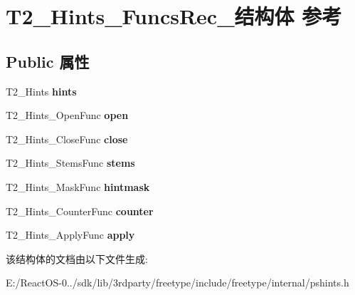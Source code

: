 \hypertarget{struct_t2___hints___funcs_rec__}{}\section{T2\+\_\+\+Hints\+\_\+\+Funcs\+Rec\+\_\+结构体 参考}
\label{struct_t2___hints___funcs_rec__}
\subsection*{Public 属性}
\begin{DoxyCompactItemize}
\item 
\mbox{\label{struct_t2___hints___funcs_rec___af8daab694889bede5a513fbae5f86e25}} 
T2\+\_\+\+Hints {\bfseries hints}
\item 
\mbox{\label{struct_t2___hints___funcs_rec___a1a5e0b296ee2e2ae6711b3ee35e5fcd9}} 
T2\+\_\+\+Hints\+\_\+\+Open\+Func {\bfseries open}
\item 
\mbox{\label{struct_t2___hints___funcs_rec___a7e50e26fd55254044bc9f2ba62574352}} 
T2\+\_\+\+Hints\+\_\+\+Close\+Func {\bfseries close}
\item 
\mbox{\label{struct_t2___hints___funcs_rec___a12bfd8bae5d3df8f570fcdfb70c00139}} 
T2\+\_\+\+Hints\+\_\+\+Stems\+Func {\bfseries stems}
\item 
\mbox{\label{struct_t2___hints___funcs_rec___af50d0cadda7033d7dbd27a199ccfcdd4}} 
T2\+\_\+\+Hints\+\_\+\+Mask\+Func {\bfseries hintmask}
\item 
\mbox{\label{struct_t2___hints___funcs_rec___ad9d856a64b4a8556fc8d74bae1779e11}} 
T2\+\_\+\+Hints\+\_\+\+Counter\+Func {\bfseries counter}
\item 
\mbox{\label{struct_t2___hints___funcs_rec___abaf12efb416bd79cf4ce72b13e6fc68f}} 
T2\+\_\+\+Hints\+\_\+\+Apply\+Func {\bfseries apply}
\end{DoxyCompactItemize}


该结构体的文档由以下文件生成\+:\begin{DoxyCompactItemize}
\item 
E\+:/\+React\+O\+S-\/0../sdk/lib/3rdparty/freetype/include/freetype/internal/pshints.\+h\end{DoxyCompactItemize}
